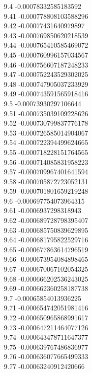 {9.4	-0.00078332585183592\\
9.41	-0.000778808103588296\\
9.42	-0.00077431640979897\\
9.43	-0.000769850620218539\\
9.44	-0.000765410585469072\\
9.45	-0.000760996157034567\\
9.46	-0.000756607187248233\\
9.47	-0.000752243529302025\\
9.48	-0.000747905037233929\\
9.49	-0.000743591565918416\\
9.5	-0.00073930297106644\\
9.51	-0.000735039109228626\\
9.52	-0.000730799837776178\\
9.53	-0.000726585014904067\\
9.54	-0.000722394499624665\\
9.55	-0.000718228151764565\\
9.56	-0.000714085831958223\\
9.57	-0.000709967401641594\\
9.58	-0.000705872723052131\\
9.59	-0.000701801659219248\\
9.6	-0.000697754073964315\\
9.61	-0.0006937298318943\\
9.62	-0.000689728798395407\\
9.63	-0.000685750839629895\\
9.64	-0.000681795822529716\\
9.65	-0.000677863614796519\\
9.66	-0.000673954084898465\\
9.67	-0.000670067102054325\\
9.68	-0.000666202536243025\\
9.69	-0.000662360258187738\\
9.7	-0.00065854013936225\\
9.71	-0.000654742051981416\\
9.72	-0.000650965868991617\\
9.73	-0.000647211464077126\\
9.74	-0.000643478711647377\\
9.75	-0.000639767486836977\\
9.76	-0.000636077665499333\\
9.77	-0.00063240912420666\\
}
